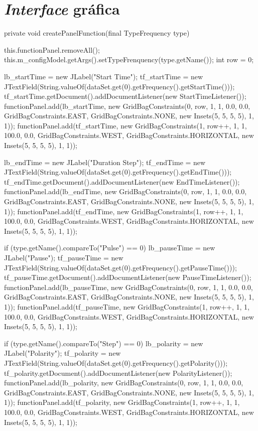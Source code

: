 \section{\textit{Interface} gráfica}

\begin{codigo}[caption={Código para gerar a os parâmetros para a modulação}, label={code:panel-all}, breaklines=true]
	private void createPanelFunction(final TypeFrequency type) {
		
		this.functionPanel.removeAll();
		this.m_configModel.getArgs().setTypeFrenquency(type.getName());
		int row = 0;
		
		lb_startTime = new JLabel("Start Time");
		tf_startTime = new JTextField(String.valueOf(dataSet.get(0).getFrequency().getStartTime()));
		tf_startTime.getDocument().addDocumentListener(new StartTimeListener());
		functionPanel.add(lb_startTime, new GridBagConstraints(0, row, 1, 1, 0.0, 0.0, GridBagConstraints.EAST,
		GridBagConstraints.NONE, new Insets(5, 5, 5, 5), 1, 1));
		functionPanel.add(tf_startTime, new GridBagConstraints(1, row++, 1, 1, 100.0, 0.0, GridBagConstraints.WEST,
		GridBagConstraints.HORIZONTAL, new Insets(5, 5, 5, 5), 1, 1));
		
		lb_endTime = new JLabel("Duration Step");
		tf_endTime = new JTextField(String.valueOf(dataSet.get(0).getFrequency().getEndTime()));
		tf_endTime.getDocument().addDocumentListener(new EndTimeListener());
		functionPanel.add(lb_endTime, new GridBagConstraints(0, row, 1, 1, 0.0, 0.0, GridBagConstraints.EAST,
		GridBagConstraints.NONE, new Insets(5, 5, 5, 5), 1, 1));
		functionPanel.add(tf_endTime, new GridBagConstraints(1, row++, 1, 1, 100.0, 0.0, GridBagConstraints.WEST,
		GridBagConstraints.HORIZONTAL, new Insets(5, 5, 5, 5), 1, 1));
		
		if (type.getName().compareTo("Pulse") == 0) {
			lb_pauseTime = new JLabel("Pause");
			tf_pauseTime = new JTextField(String.valueOf(dataSet.get(0).getFrequency().getPauseTime()));
			tf_pauseTime.getDocument().addDocumentListener(new PauseTimeListener());
			functionPanel.add(lb_pauseTime, new GridBagConstraints(0, row, 1, 1, 0.0, 0.0, GridBagConstraints.EAST,
			GridBagConstraints.NONE, new Insets(5, 5, 5, 5), 1, 1));
			functionPanel.add(tf_pauseTime, new GridBagConstraints(1, row++, 1, 1, 100.0, 0.0, GridBagConstraints.WEST,
			GridBagConstraints.HORIZONTAL, new Insets(5, 5, 5, 5), 1, 1));
		}
		
		if (type.getName().compareTo("Step") == 0) {
			lb_polarity = new JLabel("Polarity");
			tf_polarity = new JTextField(String.valueOf(dataSet.get(0).getFrequency().getPolarity()));
			tf_polarity.getDocument().addDocumentListener(new PolarityListener());
			functionPanel.add(lb_polarity, new GridBagConstraints(0, row, 1, 1, 0.0, 0.0, GridBagConstraints.EAST,
			GridBagConstraints.NONE, new Insets(5, 5, 5, 5), 1, 1));
			functionPanel.add(tf_polarity, new GridBagConstraints(1, row++, 1, 1, 100.0, 0.0, GridBagConstraints.WEST,
			GridBagConstraints.HORIZONTAL, new Insets(5, 5, 5, 5), 1, 1));
		}
		
}
\end{codigo}
